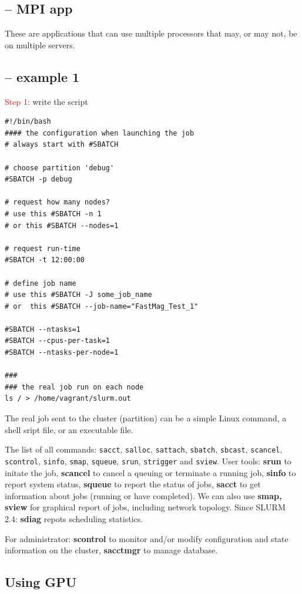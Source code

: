 \subsection{-- MPI app}

 These are applications that can use multiple processors that may, or may not,
be on multiple servers.

\subsection{-- example 1}

\textcolor{red}{Step 1}: write the script
\begin{verbatim}
#!/bin/bash
#### the configuration when launching the job
# always start with #SBATCH

# choose partition 'debug'
#SBATCH -p debug
 
# request how many nodes?
# use this #SBATCH -n 1
# or this #SBATCH --nodes=1

# request run-time 
#SBATCH -t 12:00:00

# define job name
# use this #SBATCH -J some_job_name
# or  this #SBATCH --job-name="FastMag_Test_1"

#SBATCH --ntasks=1
#SBATCH --cpus-per-task=1
#SBATCH --ntasks-per-node=1

###
### the real job run on each node  
ls / > /home/vagrant/slurm.out
\end{verbatim}

The real job sent to the cluster (partition) can be a simple Linux command, a
shell sript file, or an executable file.

The list of all commands: \verb!sacct!, \verb!salloc!, \verb!sattach!,
\verb!sbatch!, \verb!sbcast!, \verb!scancel!, \verb!scontrol!, \verb!sinfo!,
\verb!smap!, \verb!squeue!,  \verb!srun!, \verb!strigger! and \verb!sview!.
User tools: {\bf srun} to initate the job, {\bf scancel} to cancel a queuing or
terminate a running job, {\bf sinfo} to report system status, {\bf squeue} to
report the status of jobs, {\bf sacct} to get information about jobs (running
or have completed). We can also use {\bf smap, sview} for graphical report of
jobs, including network topology. Since SLURM 2.4: {\bf sdiag} repots scheduling
statistics. 

For administrator: {\bf scontrol} to monitor and/or modify configuration and
state information on the cluster, {\bf sacctmgr} to manage database. 

\subsection{Using GPU}

